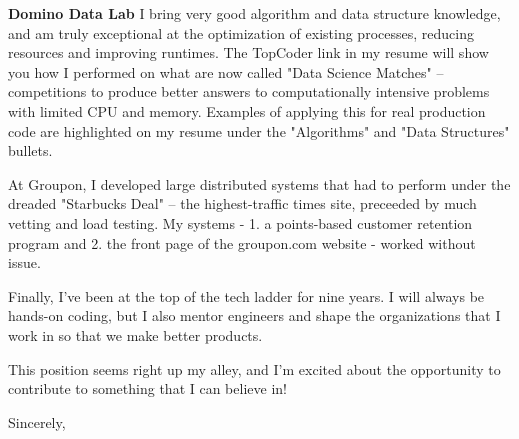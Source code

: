 \documentclass[11pt]{letter} %
\begin{document}
\begin{letter}{\large \bfseries Domino Data Lab}
I bring very good algorithm and data structure knowledge, and am truly exceptional at
the optimization of existing processes, reducing resources and improving runtimes.  The
TopCoder link in my resume will show you how I performed on what are now called "Data Science
Matches" -- competitions to produce better answers to computationally intensive problems
with limited CPU and memory.  Examples of applying this for real production code
are highlighted on my resume under the "Algorithms" and "Data Structures" bullets.

At Groupon, I developed large distributed systems that had to perform under the dreaded
"Starbucks Deal" -- the highest-traffic times site, preceeded by much vetting and load
testing.  My systems - 1. a points-based customer retention program and 2. the front page
of the groupon.com website -  worked without issue.

Finally, I've been at the top of the tech ladder for nine years.  I will always be hands-on
coding, but I also mentor engineers and shape the organizations that I work in so that we
make better products.

This position seems right up my alley, and I'm excited about the opportunity to contribute
to something that I can believe in!

\closing{Sincerely,}


\end{letter}
\end{document}
